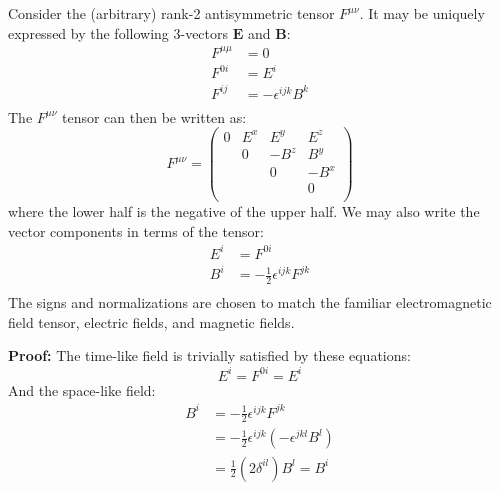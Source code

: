 \documentclass[12pt]{article}
\theoremstyle{definition}
\begin{document}
Consider the (arbitrary) rank-2 antisymmetric tensor $F^{\mu\nu}$. It may be uniquely expressed by the
following 3-vectors $\bm{E}$ and $\bm{B}$:
\begin{equation*}
\begin{split}
    F^{\mu \mu} &= 0 \\
    F^{0i} &= E^i \\
    F^{ij} &= -\epsilon^{ijk} B^k \\
\end{split}
\end{equation*}
The $F^{\mu\nu}$ tensor can then be written as:
\begin{equation*}
    F^{\mu\nu}
    =
    \begin{pmatrix}
        0 & E^x & E^y & E^z \\
        & 0 & -B^z & B^y \\
        & & 0 & -B^x \\
        & & & 0 \\
    \end{pmatrix}
\end{equation*}
where the lower half is the negative of the upper half. We may also write the vector components in terms
of the tensor:
\begin{equation*}
\begin{split}
    E^i &= F^{0i} \\
    B^i &= -\frac{1}{2} \epsilon^{ijk} F^{jk} \\
\end{split}
\end{equation*}
The signs and normalizations are chosen to match the familiar electromagnetic field tensor, electric fields,
and magnetic fields.

\textbf{Proof:}
The time-like field is trivially satisfied by these equations:
\begin{equation*}
    E^i = F^{0i} = E^i
\end{equation*}
And the space-like field:
\begin{equation*}
\begin{split}
    B^i
        &= -\frac{1}{2} \epsilon^{ijk} F^{jk} \\
        &= -\frac{1}{2} \epsilon^{ijk} \left( -\epsilon^{jkl} B^l \right) \\
        &= \frac{1}{2} (2\delta^{il}) B^l = B^i \\
\end{split}
\end{equation*}
\end{document}
